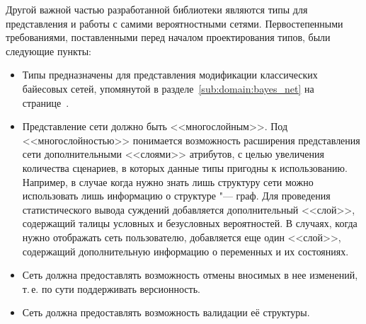 Другой важной частью разработанной библиотеки являются типы для представления и работы с самими вероятностными сетями.
Первостепенными требованиями, поставленными перед началом проектирования типов, были следующие пункты:
\begin{itemize}
  \item Типы предназначены для представления модификации классических байесовых сетей, упомянутой в разделе~\ref{sub:domain:bayes_net} на странице~\pageref{page:domain:bayes_mod}.
  \item Представление сети должно быть <<многослойным>>.
  Под <<многослойностью>> понимается возможность расширения представления сети дополнительными <<слоями>> атрибутов, с целью увеличения количества сценариев, в которых данные типы пригодны к использованию.
  Например, в случае когда нужно знать лишь структуру сети можно использовать лишь информацию о структуре "--- граф.
  Для проведения статистического вывода суждений добавляется дополнительный <<слой>>, содержащий талицы условных и безусловных вероятностей.
  В случаях, когда нужно отображать сеть пользователю, добавляется еще один <<слой>>, содержащий дополнительную информацию о переменных и их состояниях.
  \item Сеть должна предоставлять возможность отмены вносимых в нее изменений, т.\,е. по сути поддерживать версионность.
  \item Сеть должна предоставлять возможность валидации её структуры.
\end{itemize}

